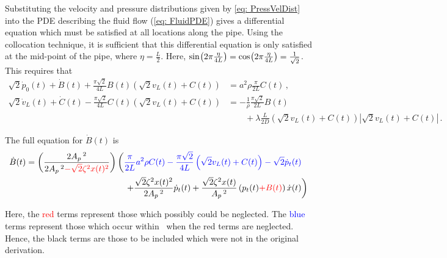 Substituting the velocity and pressure distributions given by \cref{eq: PressVelDist} into the PDE describing the fluid flow (\cref{eq: FluidPDE}) gives a differential equation which must be satisfied at all locations along the pipe. Using the collocation technique, it is sufficient that this differential equation is only satisfied at the mid-point of the pipe, where $\eta = \frac{L}{2}$. Here, $\fun{sin}{2 \pi \frac{\eta}{4L}} = \fun{cos}{2 \pi \frac{\eta}{4L}} = \frac{1}{\sqrt{2}}$.
This requires that
~
\begin{equation*}
\begin{split}
    \sqrt{2} \dot{p}_0(t) + \dot{B}(t) + \frac{\pi \sqrt{2}}{4 L} B(t) \left( \sqrt{2} v_L(t) + C(t) \right) &= a^2 \rho \frac{\pi}{2L} C(t) \, , \\
    \sqrt{2} \dot{v}_L(t) + \dot{C}(t) - \frac{\pi \sqrt{2}}{4 L} C(t) \left( \sqrt{2} v_L(t) + C(t) \right) &= - \frac{1}{\rho} \frac{\pi \sqrt{2}}{2 L} B(t) \\
    &\qquad + \lambda \frac{L}{2D} \left( \sqrt{2} v_L(t) + C(t) \right) \left| \sqrt{2} v_L(t) + C(t) \right| \, .
\end{split}
\end{equation*}

The full equation for $\dot{B}(t)$ is
~
\begin{equation*}
\begin{split}
    \dot{B}(t) = \left( \frac{2 A_p\,^2}{2 A_p\,^2 \textcolor{Red}{- \sqrt{2} \zeta^2 x(t)^2}} \right)
    &\left( \textcolor{Blue}{
    \frac{\pi}{2L} a^2 \rho C(t) - \frac{\pi \sqrt{2}}{4L} \left( \sqrt{2} v_L(t) + C(t) \right) - \sqrt{2} \dot{p}_t(t)}
     \right.  \\ & \quad \left.  %
    + \frac{\sqrt{2} \zeta^2 x(t)^2}{2 A_p\,^2} \dot{p}_t(t) + \frac{\sqrt{2} \zeta^2 x(t)}{A_p\,^2} \left( p_t(t) \textcolor{Red}{+ B(t)} \right) \dot{x}(t)
    \right)
\end{split}
\end{equation*}

Here, the \textcolor{Red}{red} terms represent those which possibly could be neglected. The \textcolor{Blue}{blue} terms represent those which occur within~\cite{Hos2015ModelPipe} when the red terms are neglected. Hence, the black terms are those to be included which were not in the original derivation.

